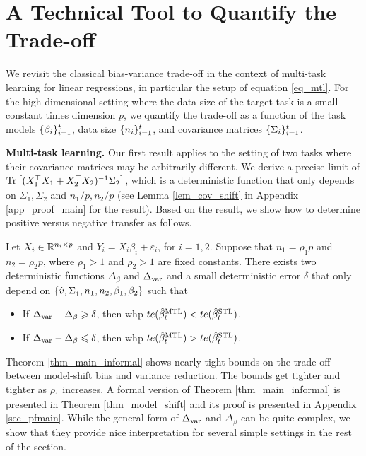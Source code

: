 \section{A Technical Tool to Quantify the Trade-off}
\label{sec_main}

We revisit the classical bias-variance trade-off in the context of multi-task learning for linear regressions, in particular the setup of equation \eqref{eq_mtl}.
For the high-dimensional setting where the data size of the target task is a small constant times dimension $p$, we quantify the trade-off as a function of the task models $\{\beta_i\}_{i=1}^t$, data size $\{n_i\}_{i=1}^t$, and covariance matrices $\{\Sigma_i\}_{i=1}^t$.

\textbf{Multi-task learning.} Our first result applies to the setting of two tasks where their covariance matrices may be arbitrarily different.
We derive a precise limit of $\operatorname{Tr}\left[(X_1^{\top}X_1 + X_2^{\top}X_2)^{-1}\Sigma_2\right]$, which is a deterministic function that only depends on $\Sigma_1, \Sigma_2$ and $n_1/p, n_2/p$ (see Lemma \ref{lem_cov_shift} in Appendix \ref{app_proof_main} for the result).
Based on the result, we show how to determine positive versus negative transfer as follows.

\begin{theorem}[Informal]\label{thm_main_informal}
	Let $X_i \in\mathbb{R}^{n_i \times p}$ and $Y_i = X_i\beta_i + \varepsilon_i$, for $i = 1, 2$.
	Suppose that $n_1 = \rho_1 p$ and $n_2 = \rho_2 p$, where $\rho_1>1$ and $\rho_2 >1$ are fixed constants.
	There exists two deterministic functions $\Delta_{\beta}$ and $\Delta_{\text{var}}$ and a small deterministic error $\delta$ that only depend on $\{\hat{v}, \Sigma_1^{}, n_1, n_2, \beta_1, \beta_2\}$ such that
	\begin{itemize}
		\item If $\Delta_{\text{var}} - \Delta_{\beta} \geqslant \delta$, then whp $te(\hat{\beta}_t^{\text{MTL}}) < te(\hat{\beta}_t^{\text{STL}})$.
		\item If $\Delta_{\text{var}} - \Delta_{\beta} \leqslant \delta$, then whp $te(\hat{\beta}_t^{\text{MTL}}) > te(\hat{\beta}_t^{\text{STL}})$.
	\end{itemize}
\end{theorem}

Theorem \ref{thm_main_informal} shows nearly tight bounds on the trade-off between model-shift bias and variance reduction.
The bounds get tighter and tighter as $\rho_1$ increases.
A formal version of Theorem \ref{thm_main_informal} is presented in Theorem \ref{thm_model_shift} and its proof is presented in Appendix \ref{sec_pfmain}.
While the general form of $\Delta_{\text{var}}$ and $\Delta_{\beta}$ can be quite complex, we show that they provide nice interpretation for several simple settings in the rest of the section.

